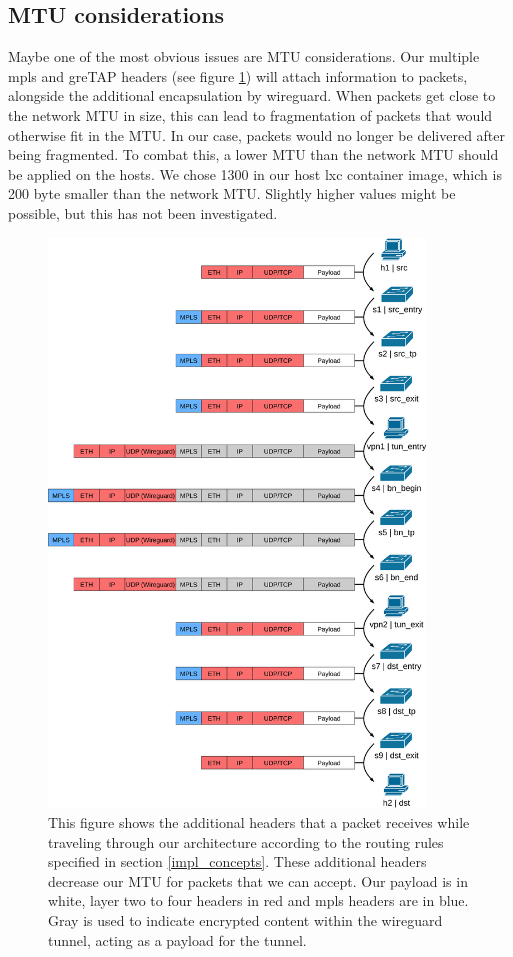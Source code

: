 \subsection{MTU considerations}
Maybe one of the most obvious issues are MTU considerations. Our multiple \acrshort{mpls} and \acrshort{gre}TAP headers (see figure \ref{fig:packet_structure}) will attach information to packets, alongside the additional encapsulation by \gls{wireguard}. When packets get close to the network MTU in size, this can lead to fragmentation of packets that would otherwise fit in the MTU. In our case, packets would no longer be delivered after being fragmented. To combat this, a lower MTU than the network MTU should be applied on the hosts. We chose 1300 in our host \acrshort{lxc} container image, which is 200 byte smaller than the network MTU. Slightly higher values might be possible, but this has not been investigated.

\begin{figure}[hp]
    \centering
    \includegraphics[width=10cm]{images/chapter_6/packet_structure.png}
    \caption[Additional headers of packets]{This figure shows the additional headers that a packet receives while traveling through our architecture according to the routing rules specified in section \ref{impl_concepts}. These additional headers decrease our MTU for packets that we can accept. Our payload is in white, layer two to four headers in red and \acrshort{mpls} headers are in blue. Gray is used to indicate encrypted content within the \gls{wireguard} tunnel, acting as a payload for the tunnel.}
    \label{fig:packet_structure}
\end{figure}

